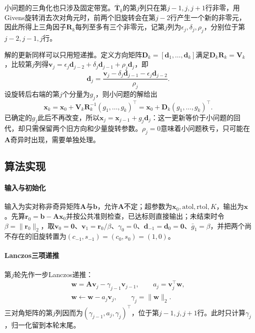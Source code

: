 小问题的三角化也只涉及固定带宽。$\overline{\bm T}_k$的第$j$列只在第$j-1,j,j+1$行非零，用Givens旋转消去次对角元时，前两个旧旋转会在第$j-2$行产生一个新的非零元，因此所得上三角因子$\bm R_k$每列至多有三个非零元，记第$j$列为$\epsilon_j,\delta_j,\rho_j$，分别位于第$j-2,j-1,j$行。

解的更新同样可以只用短递推。定义方向矩阵$\bm D_k=[\bm d_1,\ldots,\bm d_k]$满足$\bm D_k\bm R_k=\bm V_k$，比较第$j$列得$\bm v_j=\epsilon_j\bm d_{j-2}+\delta_j\bm d_{j-1}+\rho_j\bm d_j$，即
\[
 \bm d_j=\frac{\bm v_j-\delta_j\bm d_{j-1}-\epsilon_j\bm d_{j-2}}{\rho_j}.
\]
设旋转后右端的第$j$个分量为$g_j$，则小问题的解给出
\[
 \bm x_k=\bm x_0+\bm V_k\bm R_k^{-1}(g_1,\ldots,g_k)^\top=\bm x_0+\bm D_k(g_1,\ldots,g_k)^\top .
\]
已确定的$g_j$此后不再改变，所以$\bm x_j=\bm x_{j-1}+g_j\bm d_j$：这一更新等价于小问题的回代，却只需保留两个旧方向和少量旋转参数。$\rho_j=0$意味着小问题秩亏，只可能在$\bm A$奇异时出现，需要单独处理。

\subsection{算法实现}

\paragraph{输入与初始化}
输入为实对称非奇异矩阵$\bm A$与$\bm b$，允许$\bm A$不定；超参数为$\bm x_0,\mathrm{atol},\mathrm{rtol},K$，输出为$\bm x$。先算$\bm r_0=\bm b-\bm A\bm x_0$并按公共准则检查，已达标则直接输出；未结束时令$\beta=\lVert\bm r_0\rVert_2$，取$\bm v_0=\bm 0$、$\bm v_1=\bm r_0/\beta$、$\gamma_0=0$、$\bm d_{-1}=\bm d_0=\bm 0$、$\bar g_1=\beta$，并把两个尚不存在的旧旋转置为$(c_{-1},s_{-1})=(c_0,s_0)=(1,0)$。

\paragraph{Lanczos三项递推}
第$j$轮先作一步Lanczos递推：
\[
 \begin{gathered}
 \bm w=\bm A\bm v_j-\gamma_{j-1}\bm v_{j-1},\qquad a_j=\bm v_j^\top\bm w,\\
 \bm w\leftarrow\bm w-a_j\bm v_j,\qquad \gamma_j=\lVert\bm w\rVert_2 .
 \end{gathered}
\]
三对角矩阵的第$j$列因而为$(\gamma_{j-1},a_j,\gamma_j)^\top$，位于第$j-1,j,j+1$行。此时只计算$\gamma_j$，归一化留到本轮末尾。

